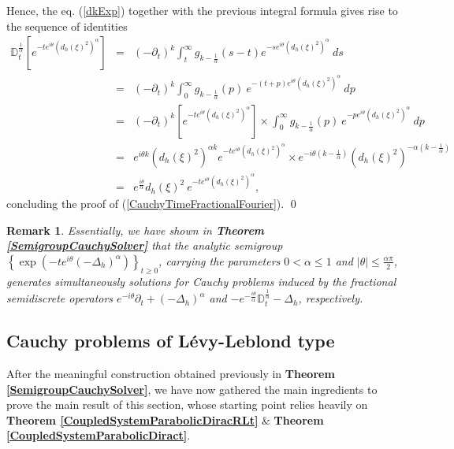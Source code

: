 \documentclass{elsarticle}
\newcommand{\RL}{{\mathbb D}_t}
\newtheorem{remark}{Remark}[section]
\begin{document}
Hence, the eq. (\ref{dkExp}) together with the previous integral formula gives rise to the sequence of identities
\begin{eqnarray*}
	\mathbb{D}_t^{\frac{1}{\alpha}}\left[e^{-te^{i\theta }\left(d_h(\xi)^2\right)^\alpha}\right]&=&\left(-\partial_t\right)^{k} \int_t^\infty g_{k-\frac{1}{\alpha}}(s-t)e^{-se^{i\theta}\left(d_h(\xi)^2\right)^\alpha}~ds \\
	&=&\left(-\partial_t\right)^{k} \int_0^\infty g_{k-\frac{1}{\alpha}}(p)~e^{-(t+p)e^{i\theta}\left(d_h(\xi)^2\right)^\alpha}~dp \\
	&=&\left(-\partial_t\right)^{k}\left[e^{-te^{i\theta}\left(d_h(\xi)^2\right)^\alpha}\right]\times  \int_0^\infty g_{k-\frac{1}{\alpha}}(p)~e^{-pe^{i\theta}\left(d_h(\xi)^2\right)^\alpha}~dp\\
	&=&e^{i \theta k}\left(d_h(\xi)^2\right)^{\alpha k}e^{-te^{i\theta}\left(d_h(\xi)^2\right)^\alpha} \times e^{-i \theta\left(k-\frac{1}{\alpha}\right)}\left(d_h(\xi)^2\right)^{-\alpha(k-\frac{1}{\alpha})} \\
	&=&e^{\frac{i \theta}{\alpha}}d_h(\xi)^2~e^{-te^{i\theta}\left(d_h(\xi)^2\right)^\alpha},
\end{eqnarray*}
concluding the proof of (\ref{CauchyTimeFractionalFourier}).
\qed
\begin{remark}
	Essentially, we have shown in {\bf Theorem \ref{SemigroupCauchySolver}} that the analytic semigroup $\left\{\exp\left(-te^{i\theta}(-\Delta_h)^\alpha\right)\right\}_{t\geq 0}$, carrying the parameters $0<\alpha\leq 1$ and $|\theta|\leq\frac{\alpha\pi}{2}$, generates simultaneously solutions for Cauchy problems induced by the fractional semidiscrete operators $e^{-i\theta}\partial_t+(-\Delta_h)^\alpha$ and $-e^{-\frac{i\theta}{\alpha}}\RL^{\frac{1}{\alpha}}-\Delta_h$, respectively.
\end{remark}



\subsection{Cauchy problems of L\'evy-Leblond type}



After the meaningful construction obtained previously in {\bf Theorem \ref{SemigroupCauchySolver}}, we have now gathered the main ingredients to prove the main result of this section, whose starting point relies heavily on 
{\bf Theorem \ref{CoupledSystemParabolicDiracRLt}} \& {\bf Theorem \ref{CoupledSystemParabolicDiract}}.
\end{document}
